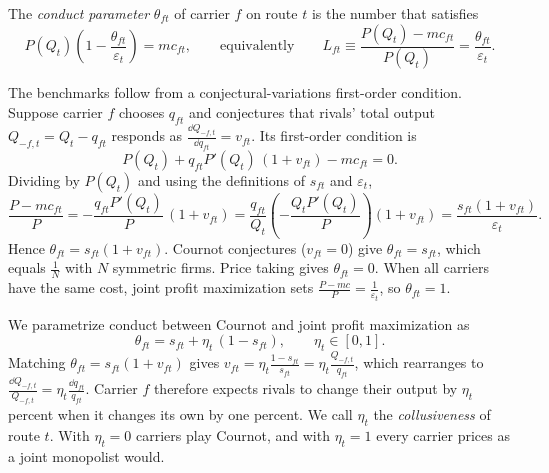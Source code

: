 \begin{definition}\label{def:09-conduct}
The \emph{conduct parameter} $\theta_{ft}$ of carrier $f$ on route $t$ is the number that satisfies
\begin{equation}\label{eq:09-conduct-foc}
P(Q_t)\left(1-\frac{\theta_{ft}}{\varepsilon_t}\right)=mc_{ft},
\qquad\text{equivalently}\qquad
L_{ft}\equiv\frac{P(Q_t)-mc_{ft}}{P(Q_t)}=\frac{\theta_{ft}}{\varepsilon_t}.
\end{equation}
\end{definition}

The benchmarks follow from a conjectural-variations first-order condition. Suppose carrier $f$ chooses
$q_{ft}$ and conjectures that rivals' total output $Q_{-f,t}=Q_t-q_{ft}$ responds as
$\frac{\dd Q_{-f,t}}{\dd q_{ft}}=v_{ft}$. Its first-order condition is
\begin{equation*}
P(Q_t)+q_{ft}P'(Q_t)\,(1+v_{ft})-mc_{ft}=0 .
\end{equation*}
Dividing by $P(Q_t)$ and using the definitions of $s_{ft}$ and $\varepsilon_t$,
\begin{equation*}
\frac{P-mc_{ft}}{P}
=-\frac{q_{ft}P'(Q_t)}{P}\,(1+v_{ft})
=\frac{q_{ft}}{Q_t}\left(-\frac{Q_tP'(Q_t)}{P}\right)(1+v_{ft})
=\frac{s_{ft}(1+v_{ft})}{\varepsilon_t}.
\end{equation*}
Hence $\theta_{ft}=s_{ft}(1+v_{ft})$. Cournot conjectures ($v_{ft}=0$) give $\theta_{ft}=s_{ft}$, which
equals $\frac{1}{N}$ with $N$ symmetric firms. Price taking gives $\theta_{ft}=0$. When all carriers have
the same cost, joint profit maximization sets $\frac{P-mc}{P}=\frac{1}{\varepsilon_t}$, so
$\theta_{ft}=1$.

We parametrize conduct between Cournot and joint profit maximization as
\begin{equation}\label{eq:09-theta-param}
\theta_{ft}=s_{ft}+\eta_t\,(1-s_{ft}),\qquad \eta_t\in[0,1].
\end{equation}
Matching $\theta_{ft}=s_{ft}(1+v_{ft})$ gives $v_{ft}=\eta_t\frac{1-s_{ft}}{s_{ft}}=\eta_t\frac{Q_{-f,t}}{q_{ft}}$,
which rearranges to $\frac{\dd Q_{-f,t}}{Q_{-f,t}}=\eta_t\frac{\dd q_{ft}}{q_{ft}}$. Carrier $f$ therefore
expects rivals to change their output by $\eta_t$ percent when it changes its own by one percent. We call
$\eta_t$ the \emph{collusiveness} of route $t$. With $\eta_t=0$ carriers play Cournot, and with
$\eta_t=1$ every carrier prices as a joint monopolist would.

